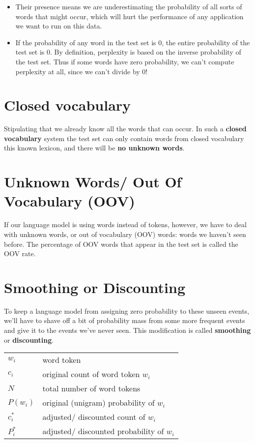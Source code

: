 \begin{itemize}
    \item Their presence means we are underestimating the probability of all sorts of words that might occur, which will hurt the performance of any application we want to run on this data.
    \item If the probability of any word in the test set is 0, the entire probability of the test set is 0. By definition, perplexity is based on the inverse probability of the test set. Thus if some words have zero probability, we can’t compute perplexity at all, since we can’t divide by 0!
\end{itemize}


\section{Closed vocabulary \cite{nlp-1}}

Stipulating that we already know all the words that can occur. In such a \textbf{closed vocabulary} system the test set can only contain words from closed vocabulary this known lexicon, and there will be \textbf{no unknown words}.


\section{Unknown Words/ Out Of Vocabulary (OOV) \cite{nlp-1}}

If our language model is using words instead of tokens, however, we have to deal with unknown words, or out of vocabulary (OOV) words: words we haven’t seen before. The percentage of OOV words that appear in the test set is called the OOV rate.


\section{Smoothing or Discounting \cite{nlp-1}}

To keep a language model from assigning zero probability to these unseen events, we’ll have to shave off a bit of probability mass from some more frequent events and give it to the events we’ve never seen. This modification is called \textbf{smoothing} or \textbf{discounting}.

\begin{table}[H]
    \begin{tabular}{l l}
        $w_i$ & word token \\
        $c_i$ & original count of word token $w_i$ \\
        $N$ & total number of word tokens \\
        $P(w_i)$ & original (unigram) probability of $w_i$ \\
        $c_i^*$ & adjusted/ discounted count of $w_i$ \\
        $P_i^*$ & adjusted/ discounted probability of $w_i$ \\
    \end{tabular}
\end{table}

